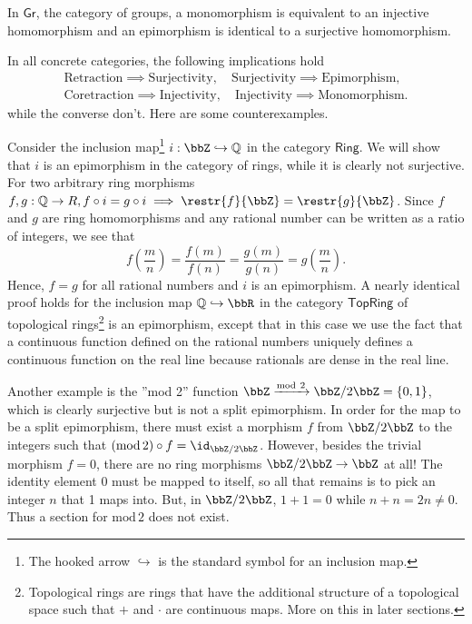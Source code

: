 %
\begin{prop}
    In $\mathsf{Gr}$, the category of groups, a monomorphism is equivalent
    to an injective homomorphism and an epimorphism is identical to a
    surjective homomorphism.
\end{prop}
In all concrete categories, the following implications hold 
\begin{gather}
    \text{Retraction}\implies\text{Surjectivity},\quad\text{Surjectivity}\implies\text{Epimorphism},\\
    \text{Coretraction}\implies\text{Injectivity},\quad\text{Injectivity}\implies\text{Monomorphism.}
\end{gather}
while the converse don't. Here are some counterexamples. 
\begin{example}
    Consider the inclusion map\footnote{The hooked arrow $\hookrightarrow$ is the standard symbol for an
    inclusion map.} $i:\bbZ\hookrightarrow\mathbb{Q}$ in the category $\mathsf{Ring}$.
    We will show that $i$ is an epimorphism in the category of rings,
    while it is clearly not surjective. For two arbitrary ring morphisms
    $f,g:\mathbb{Q}\rightarrow R,f\circ i=g\circ i\implies\restr{f}{\bbZ}=\restr{g}{\bbZ}$.
    Since $f$ and $g$ are ring homomorphisms and any rational number
    can be written as a ratio of integers, we see that 
    \begin{equation}
    f\left(\frac{m}{n}\right)=\frac{f(m)}{f(n)}=\frac{g(m)}{g(n)}=g\left(\frac{m}{n}\right).
    \end{equation}
    Hence, $f=g$ for all rational numbers and $i$ is an epimorphism.
    A nearly identical proof holds for the inclusion map $\mathbb{Q}\hookrightarrow\bbR $
    in the category $\mathsf{TopRing}$ of topological rings\footnote{Topological rings are rings that have the additional structure of
    a topological space such that $+$ and $\cdot$ are continuous maps.
    More on this in later sections.} is an epimorphism, except that in this case we use the fact that
    a continuous function defined on the rational numbers uniquely defines
    a continuous function on the real line because rationals are dense
    in the real line.
\end{example}
%
\begin{example}
    Another example is the ''mod 2'' function $\bbZ\xrightarrow{\text{mod}~2}\bbZ/2\bbZ=\{0,1\}$,
    which is clearly surjective but is not a split epimorphism. In order
    for the map to be a split epimorphism, there must exist a morphism
    $f$ from $\bbZ/2\bbZ$ to the integers such that $\left(\text{mod}\,2\right)\circ f=\id_{\bbZ/2\bbZ}$.
    However, besides the trivial morphism $f=0$, there are no ring morphisms
    $\bbZ/2\bbZ\to\bbZ$ at all! The identity element
    0 must be mapped to itself, so all that remains is to pick an integer
    $n$ that 1 maps into. But, in $\bbZ/2\bbZ$, $1+1=0$
    while $n+n=2n\ne0$. Thus a section for $\text{mod}\,2$ does not exist.
\end{example}
